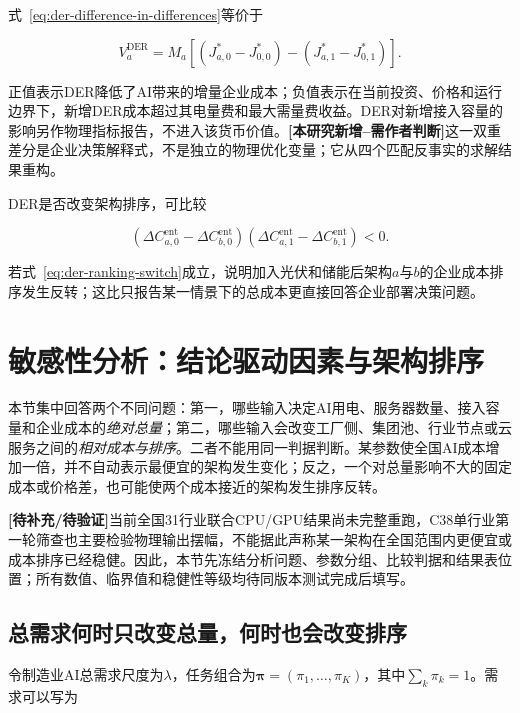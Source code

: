 \documentclass[preprint]{elsarticle}
\newcommand{\newwork}{\textcolor{orange!80!black}{\textbf{[本研究新增--需作者判断]}}}
\newcommand{\pending}{\textcolor{red!70!black}{\textbf{[待补充/待验证]}}}
\begin{document}
式~\eqref{eq:der-difference-in-differences}等价于

\begin{equation}
 V^{\mathrm{DER}}_a
 =M_a\left[(J_{a,0}^{*}-J_{0,0}^{*})
 -(J_{a,1}^{*}-J_{0,1}^{*})\right].
 \label{eq:der-did-expanded}
\end{equation}

正值表示DER降低了AI带来的增量企业成本；负值表示在当前投资、价格和运行边界下，新增DER成本超过其电量费和最大需量费收益。DER对新增接入容量的影响另作物理指标报告，不进入该货币价值。\newwork 这一双重差分是企业决策解释式，不是独立的物理优化变量；它从四个匹配反事实的求解结果重构。

DER是否改变架构排序，可比较

\begin{equation}
 \left(\Delta C^{\mathrm{ent}}_{a,0}-\Delta C^{\mathrm{ent}}_{b,0}\right)
 \left(\Delta C^{\mathrm{ent}}_{a,1}-\Delta C^{\mathrm{ent}}_{b,1}\right)<0.
 \label{eq:der-ranking-switch}
\end{equation}

若式~\eqref{eq:der-ranking-switch}成立，说明加入光伏和储能后架构$a$与$b$的企业成本排序发生反转；这比只报告某一情景下的总成本更直接回答企业部署决策问题。

\section{敏感性分析：结论驱动因素与架构排序}
\label{sec:sensitivity-analysis}

本节集中回答两个不同问题：第一，哪些输入决定AI用电、服务器数量、接入容量和企业成本的\emph{绝对总量}；第二，哪些输入会改变工厂侧、集团池、行业节点或云服务之间的\emph{相对成本与排序}。二者不能用同一判据判断。某参数使全国AI成本增加一倍，并不自动表示最便宜的架构发生变化；反之，一个对总量影响不大的固定成本或价格差，也可能使两个成本接近的架构发生排序反转。

\pending 当前全国31行业联合CPU/GPU结果尚未完整重跑，C38单行业第一轮筛查也主要检验物理输出摆幅，不能据此声称某一架构在全国范围内更便宜或成本排序已经稳健。因此，本节先冻结分析问题、参数分组、比较判据和结果表位置；所有数值、临界值和稳健性等级均待同版本测试完成后填写。

\subsection{总需求何时只改变总量，何时也会改变排序}

令制造业AI总需求尺度为$\lambda$，任务组合为$\bm\pi=(\pi_1,\ldots,\pi_K)$，其中$\sum_k\pi_k=1$。需求可以写为
\end{document}
